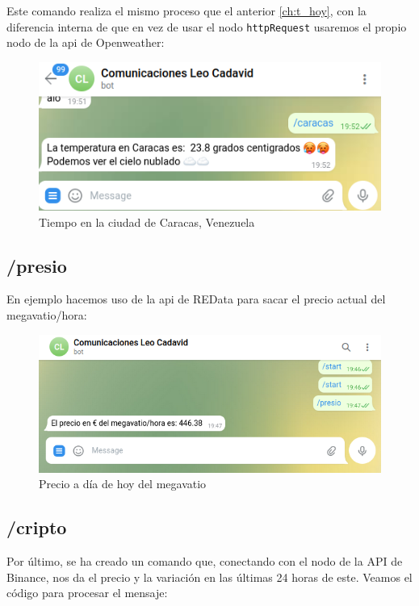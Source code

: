 \documentclass[12pt]{article}
\begin{document}
Este comando realiza el mismo proceso que el anterior \ref{ch:t_hoy}, con la diferencia interna de que en vez de usar
el nodo \verb|httpRequest| usaremos el propio nodo de la api de Openweather: 

\begin{figure}[H]
    \centering
    \includegraphics[scale=0.4]{tiempoCaracas.png}
    \caption{Tiempo en la ciudad de Caracas, Venezuela}
    \label{tencaracas}
\end{figure}

\subsection{/presio}

En ejemplo hacemos uso de la api de REData para sacar el  precio actual del megavatio/hora:

\begin{figure}[H]
    \centering
    \includegraphics[scale=0.4]{comandopRESIO.png}
    \caption{Precio a día de hoy del megavatio}
    \label{presio}
\end{figure}

\subsection{/cripto}

Por último, se ha creado un comando que, conectando con el nodo de la API de Binance, nos da el precio y la variación en las últimas 
24 horas de este. Veamos el código para procesar el mensaje:
\end{document}
